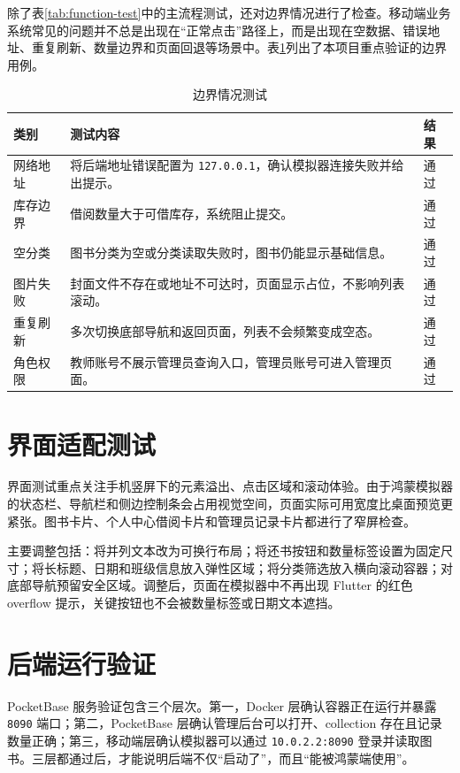 除了表\ref{tab:function-test}中的主流程测试，还对边界情况进行了检查。移动端业务系统常见的问题并不总是出现在“正常点击”路径上，而是出现在空数据、错误地址、重复刷新、数量边界和页面回退等场景中。表\ref{tab:edge-test}列出了本项目重点验证的边界用例。

\begin{table}[htbp]
\centering
\caption{边界情况测试}
\label{tab:edge-test}
\begin{tabularx}{0.95\textwidth}{l>{\RaggedRight\arraybackslash}Xl}
\toprule
\textbf{类别} & \textbf{测试内容} & \textbf{结果} \\
\midrule
网络地址 & 将后端地址错误配置为 \texttt{127.0.0.1}，确认模拟器连接失败并给出提示。 & 通过 \\
库存边界 & 借阅数量大于可借库存，系统阻止提交。 & 通过 \\
空分类 & 图书分类为空或分类读取失败时，图书仍能显示基础信息。 & 通过 \\
图片失败 & 封面文件不存在或地址不可达时，页面显示占位，不影响列表滚动。 & 通过 \\
重复刷新 & 多次切换底部导航和返回页面，列表不会频繁变成空态。 & 通过 \\
角色权限 & 教师账号不展示管理员查询入口，管理员账号可进入管理页面。 & 通过 \\
\bottomrule
\end{tabularx}
\end{table}

\section{界面适配测试}

界面测试重点关注手机竖屏下的元素溢出、点击区域和滚动体验。由于鸿蒙模拟器的状态栏、导航栏和侧边控制条会占用视觉空间，页面实际可用宽度比桌面预览更紧张。图书卡片、个人中心借阅卡片和管理员记录卡片都进行了窄屏检查。

主要调整包括：将并列文本改为可换行布局；将还书按钮和数量标签设置为固定尺寸；将长标题、日期和班级信息放入弹性区域；将分类筛选放入横向滚动容器；对底部导航预留安全区域。调整后，页面在模拟器中不再出现 Flutter 的红色 overflow 提示，关键按钮也不会被数量标签或日期文本遮挡。

\section{后端运行验证}

PocketBase 服务验证包含三个层次。第一，Docker 层确认容器正在运行并暴露 \texttt{8090} 端口；第二，PocketBase 层确认管理后台可以打开、collection 存在且记录数量正确；第三，移动端层确认模拟器可以通过 \texttt{10.0.2.2:8090} 登录并读取图书。三层都通过后，才能说明后端不仅“启动了”，而且“能被鸿蒙端使用”。

